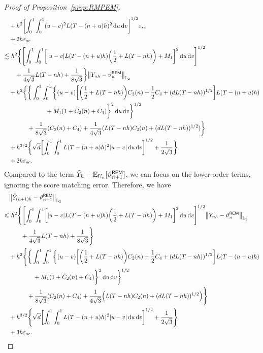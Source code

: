 \begin{proof}[Proof of Proposition~\ref{prop:RMPEM}]
\begin{align*}
    &+h^2\left[\int_0^1\int_0^1(u-v)^2L(T-(n+u)h)^2\rmd u\rmd v\right]^{1/2}\varepsilon_{sc}\\
    &+2h\varepsilon_{sc}\\
    \lesssim& \,\,h^2\bigg\{\left[\int_0^1\int_0^1\left[|u-v|L(T-(n+u)h)\left(\dfrac{1}{2}+L(T-nh)\right)+M_1\right]^2\rmd u\rmd v\right]^{1/2}\\
    &\quad+\dfrac{1}{4\sqrt{3}}L(T-nh)+\dfrac{1}{8\sqrt{3}}\bigg\}\l|Y_{nh}-\vartheta_n^{\sf REM}\r|_{\Ltwo}\\
    &+h^2\bigg\{\bigg\{\int_0^1\int_0^1\bigg\{(u-v)\left[\left(\dfrac{1}{2}+L(T-nh)\right)C_2(n)+\dfrac{1}{2}C_4+(dL(T-nh))^{1/2}\right]L(T-(n+u)h)\\
    &\qquad\qquad\qquad+M_1(1+C_2(n)+C_4)\bigg\}^2\rmd u\rmd v\bigg\}^{1/2}\\
    &\qquad\quad+\dfrac{1}{8\sqrt{3}}(C_2(n)+C_4)+\dfrac{1}{4\sqrt{3}}(L(T-nh)C_2(n)+(dL(T-nh))^{1/2})\bigg\}\\
    &+h^{3/2}\bigg\{\sqrt{d}\left[\int_0^1\int_0^1L(T-(n+u)h)^2|u-v|\rmd u\rmd v\right]^{1/2}+\dfrac{1}{2\sqrt{3}}\bigg\}\\
    &+2h\varepsilon_{sc}.
\end{align*}
Compared to the term  $\tilde{Y}_h-\mathbb{E}_{U_n}[\vartheta_{n+1}^{\sf REM}]$, we can focus on the lower-order terms, ignoring the score matching error. Therefore, we have
\begin{align*}
    &\l|\tilde{Y}_{(n+1)h}-\vartheta_{n+1}^{\sf REM}\r|_{\Ltwo}\\
    \leqslant &\,\,h^2\Bigg\{\left[\int_0^1\int_0^1\left[|u-v|L(T-(n+u)h)\left(\dfrac{1}{2}+L(T-nh)\right)+M_1\right]^2\rmd u\rmd v\right]^{1/2}\l|Y_{nh}-\vartheta_n^{\sf REM}\r|_{\Ltwo}\\
    &\qquad+\dfrac{1}{4\sqrt{3}}L(T-nh)+\dfrac{1}{8\sqrt{3}}\Bigg\}\\
    &+h^2\Bigg\{\bigg\{\int_0^1\int_0^1\bigg\{(u-v)\left[\left(\dfrac{1}{2}+L(T-nh)\right)C_2(n)+\dfrac{1}{2}C_4+(dL(T-nh))^{1/2}\right]L(T-(n+u)h)\\
    &\qquad\qquad+M_1(1+C_2(n)+C_4)\bigg\}^2\rmd u\rmd v\bigg\}^{1/2}\\
    &\qquad \quad+\dfrac{1}{8\sqrt{3}}(C_2(n)+C_4)+\dfrac{1}{4\sqrt{3}}\left(L(T-nh)C_2(n)+(dL(T-nh))^{1/2}\right)\Bigg\}\\
    &+h^{3/2}\Bigg\{\sqrt{d}\left[\int_0^1\int_0^1L(T-(n+u)h)^2|u-v|\rmd u\rmd v\right]^{1/2}+\dfrac{1}{2\sqrt{3}}\Bigg\}\\
    &+3h\varepsilon_{sc}.
\end{align*}
\end{proof}
